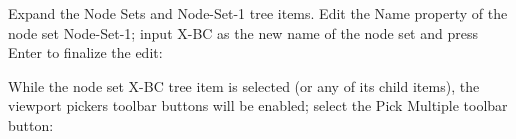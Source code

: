 \documentclass[
    11pt,        %
    a4paper,     %
    final,       %
    fleqn,       %
    notitlepage, %
    onecolumn,   %
    oneside,     %
]{article}
\begin{document}
Expand the Node Sets and Node-Set-1 tree items. Edit the Name property of the node set Node-Set-1; input X-BC as the new name of the node set and press Enter to finalize the edit:
\begin{center}
\end{center}

While the node set X-BC tree item is selected (or any of its child items), the viewport pickers toolbar buttons will be enabled; select the Pick Multiple toolbar button:
\begin{center}
\end{center}
\end{document}
